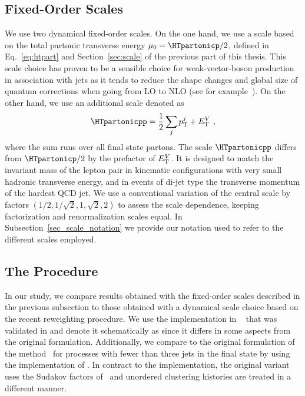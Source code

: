 \subsection{Fixed-Order Scales}
\label{sec_fo_scales}
We use two dynamical fixed-order scales. On the one hand, we use a scale based on the total partonic transverse energy $\mu_0=\HTpartonicp/2$, defined in
Eq.~\eqref{eq:htpart} and Section~\ref{sec:scale} of the previous part
of this thesis. This scale choice has proven to be a sensible
choice for weak-vector-boson production in association with jets as it tends to reduce the shape changes and global size of quantum corrections
when going from LO to NLO (see for
example~\cite{BH:W5j,BH:Z4j,BH:Wratios}). On the other hand, we use an additional scale denoted as
\begin{equation}
\HTpartonicpp=\frac{1}{2}\sum_j p_{\textrm T}^j+E_{\textrm T}^V\ ,
\label{eq_HTpp}
\end{equation}
where the sum runs over all final state partons. The scale $\HTpartonicpp$ differs from $\HTpartonicp/2$ by the prefactor of $E_{\textrm T}^V$. It is designed to match the invariant mass of the
lepton pair in kinematic configurations with very small hadronic transverse energy,
and in events of di-jet type the transverse momentum of the hardest QCD jet. We use a conventional variation of the central scale by factors
$(1/2,1/\sqrt{2},1,\sqrt{2},2)$ to assess the scale dependence, keeping factorization and renormalization
scales equal. In Subsection~\ref{sec_scale_notation} we provide our notation used to refer to the different scales employed.

\subsection{The \MINLOp{} Procedure}
\label{sec_minlo_gen}

In our study, we compare results obtained with the fixed-order scales described in the previous subsection to those obtained with a dynamical scale choice based on the recent \MINLO{} \cite{MINLO} reweighting procedure. We use the implementation in \SHERPA{}~\cite{Sherpa} that was validated in \cite{ttjjj} and denote it schematically as \MINLOp{} since it differs in some aspects from the original formulation. Additionally, we compare to the original formulation of the \MINLO{}
method~\cite{MINLO} for processes with fewer than three jets in the
final state by using the implementation of \cite{danielminlo}. In contract to the \MINLOp{} implementation, the original \MINLO{} variant
uses the Sudakov factors of~\cite{Catani:1991hj} and unordered clustering histories
are treated in a different manner.



